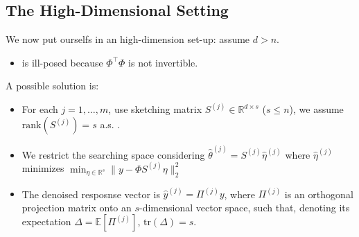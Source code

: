\documentclass[
11pt,notheorems,hyperref={pdfauthor=whatever}
]{beamer}
\begin{document}
\subsection{The High-Dimensional Setting}
\begin{frame}
    We now put ourselfs in an high-dimension set-up: assume \(d > n\).
    \begin{itemize}
        \item {} is \alert{ill-posed} because \(\Phi^\top\Phi\) is not invertible.
    \end{itemize}

    A possible solution is:
    \begin{itemize}
        \item For each \(j = 1,\dots,m\), use \alert{sketching} matrix \(S^{(j)} \in \mathbb{R}^{d \times s}\) (\(s \le n\)), we assume \(\text{rank}(S^{(j)}) = s\) a.s. .
        \item We \alert{restrict the searching} space considering \(\hat{\theta}^{(j)} = S^{(j)}\hat{\eta}^{(j)}\) where \(\hat{\eta}^{(j)}\) minimizes \(\min_{\eta \in \mathbb{R}^s} \|y - \Phi S^{(j)}\eta\|_2^2\)
        \item The denoised resposnse vector is \(\hat{y}^{(j)} = \Pi^{(j)} y\), where \(\Pi^{(j)}\) is an \alert{orthogonal projection matrix} onto an \(s\)-dimensional vector space, such that, denoting its expectation \(\Delta = \mathbb{E}[\Pi^{(j)}]\), \(\text{tr}(\Delta) = s\).
    \end{itemize}
    
\end{frame}
\end{document}
